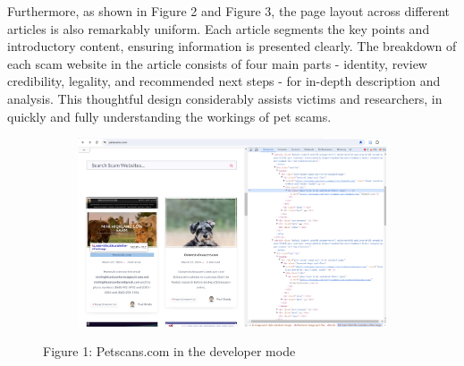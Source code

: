 \documentclass[ oneside,%
                    author={Cassie Qing Tang},
                    degree={BSc},
                     title={An Automated Response System for Disrupting Online Pet Scamming \\ },
                    subtitle={ }]{dissertation}
\begin{document}
Furthermore, as shown in Figure 2 and Figure 3, the page layout across different articles is also remarkably uniform. Each article segments the key points and introductory content, ensuring information is presented clearly. The breakdown of each scam website in the article consists of four main parts - identity, review credibility, legality, and recommended next steps - for in-depth description and analysis. This thoughtful design considerably assists victims and researchers, in quickly and fully understanding the workings of pet scams.
\begin{figure}[!htb]
    \centering
    \begin{subfigure}[b]{0.7\textwidth}
        \includegraphics[width=\linewidth,height=0.28\textheight]{pic/figure1.png}
        \label{fig:petscams}
    \end{subfigure}
    \caption{Figure 1: Petscans.com in the developer mode}
    \label{fig:main1}
\end{figure}
\end{document}
